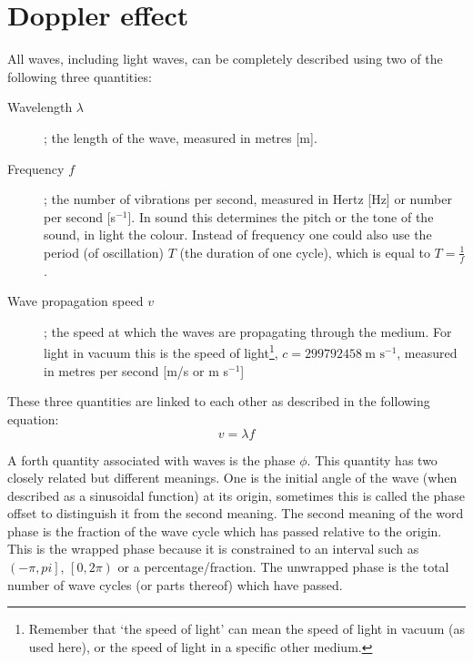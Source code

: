 \documentclass[12pt,a4paper]{article}
\numberwithin{equation}{section}
\numberwithin{figure}{section}
\numberwithin{table}{section}
\begin{document}
\section{Doppler effect}
All waves, including light waves, can be completely described using two of the following three quantities:
\begin{description}
\item[Wavelength $\lambda$]; the length of the wave, measured in metres [m].
\item[Frequency $f$]; the number of vibrations per second, measured in Hertz [Hz] or number per second [s$^{-1}$]. In sound this determines the pitch or the tone of the sound, in light the colour. Instead of frequency one could also use the period (of oscillation) $T$ (the duration of one cycle), which is equal to $T=\frac{1}{f}$.
\item[Wave propagation speed $v$];  the speed at which the waves are propagating through the medium. For light in vacuum this is the speed of light\footnote{Remember that `the speed of light' can mean the speed of light in vacuum (as used here), or the speed of light in a specific other medium.}, $c=299792458~\mbox{m s}^{-1}$, measured in metres per second [m/s or m s$^{-1}$]
\end{description}
These three quantities are linked to each other as described in the following equation:
\begin{equation} v = \lambda f \label{eq:wave}
\end{equation}

A forth quantity associated with waves is the phase $\phi$. This quantity has two closely related but different meanings. One is the initial angle of the wave (when described as a sinusoidal function) at its origin, sometimes this is called the phase offset to distinguish it from the second meaning. The second meaning of the word phase is the fraction of the wave cycle which has passed relative to the origin. This is the wrapped phase because it is constrained to an interval such as $\left( -\pi , pi\right]$, $\left[ 0,2\pi\right)$ or a percentage/fraction. The unwrapped phase is the total number of wave cycles (or parts thereof) which have passed.
\end{document}
